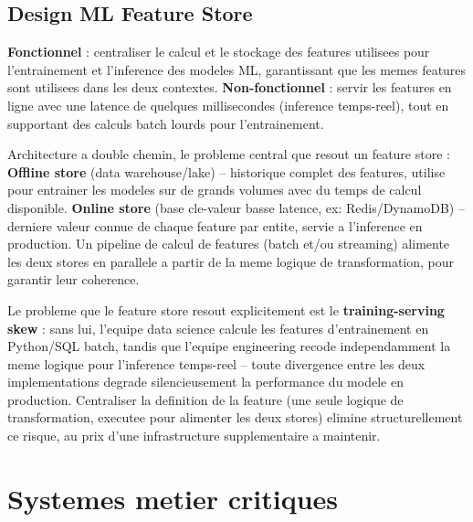 \documentclass[11pt,a4paper]{article}
\newenvironment{sujet}[1]{%
  \subsection{#1}
}{%
  \bigskip
}
\begin{document}
\begin{sujet}{Design ML Feature Store}

\begin{req}
\textbf{Fonctionnel} : centraliser le calcul et le stockage des features utilisees pour l'entrainement et l'inference des modeles ML, garantissant que les memes features sont utilisees dans les deux contextes. \textbf{Non-fonctionnel} : servir les features en ligne avec une latence de quelques millisecondes (inference temps-reel), tout en supportant des calculs batch lourds pour l'entrainement.
\end{req}

\begin{archbox}
Architecture a double chemin, le probleme central que resout un feature store : \textbf{Offline store} (data warehouse/lake) -- historique complet des features, utilise pour entrainer les modeles sur de grands volumes avec du temps de calcul disponible. \textbf{Online store} (base cle-valeur basse latence, ex: Redis/DynamoDB) -- derniere valeur connue de chaque feature par entite, servie a l'inference en production. Un pipeline de calcul de features (batch et/ou streaming) alimente les deux stores en parallele a partir de la meme logique de transformation, pour garantir leur coherence.
\end{archbox}

\begin{tradeoff}
Le probleme que le feature store resout explicitement est le \textbf{training-serving skew} : sans lui, l'equipe data science calcule les features d'entrainement en Python/SQL batch, tandis que l'equipe engineering recode independamment la meme logique pour l'inference temps-reel -- toute divergence entre les deux implementations degrade silencieusement la performance du modele en production. Centraliser la definition de la feature (une seule logique de transformation, executee pour alimenter les deux stores) elimine structurellement ce risque, au prix d'une infrastructure supplementaire a maintenir.
\end{tradeoff}

\end{sujet}

\newpage
\section{Systemes metier critiques}
\end{document}
